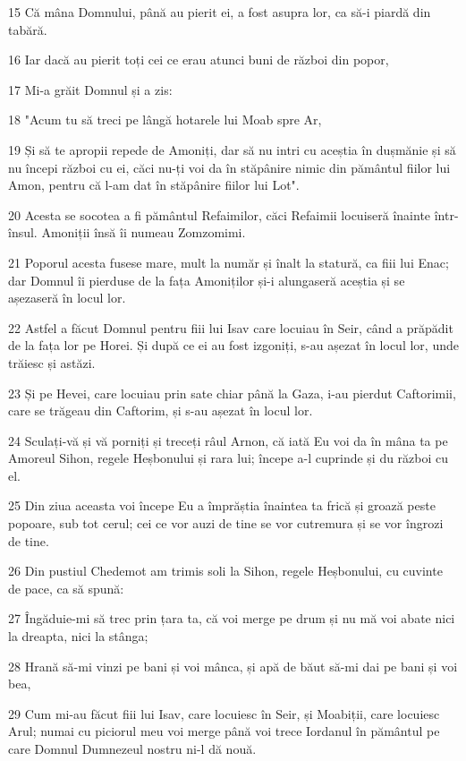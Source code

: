 \par 15 Că mâna Domnului, până au pierit ei, a fost asupra lor, ca să-i piardă din tabără.
\par 16 Iar dacă au pierit toți cei ce erau atunci buni de război din popor,
\par 17 Mi-a grăit Domnul și a zis:
\par 18 "Acum tu să treci pe lângă hotarele lui Moab spre Ar,
\par 19 Și să te apropii repede de Amoniți, dar să nu intri cu aceștia în dușmănie și să nu începi război cu ei, căci nu-ți voi da în stăpânire nimic din pământul fiilor lui Amon, pentru că l-am dat în stăpânire fiilor lui Lot".
\par 20 Acesta se socotea a fi pământul Refaimilor, căci Refaimii locuiseră înainte într-însul. Amoniții însă îi numeau Zomzomimi.
\par 21 Poporul acesta fusese mare, mult la număr și înalt la statură, ca fiii lui Enac; dar Domnul îi pierduse de la fața Amoniților și-i alungaseră aceștia și se așezaseră în locul lor.
\par 22 Astfel a făcut Domnul pentru fiii lui Isav care locuiau în Seir, când a prăpădit de la fața lor pe Horei. Și după ce ei au fost izgoniți, s-au așezat în locul lor, unde trăiesc și astăzi.
\par 23 Și pe Hevei, care locuiau prin sate chiar până la Gaza, i-au pierdut Caftorimii, care se trăgeau din Caftorim, și s-au așezat în locul lor.
\par 24 Sculați-vă și vă porniți și treceți râul Arnon, că iată Eu voi da în mâna ta pe Amoreul Sihon, regele Heșbonului și rara lui; începe a-l cuprinde și du război cu el.
\par 25 Din ziua aceasta voi începe Eu a împrăștia înaintea ta frică și groază peste popoare, sub tot cerul; cei ce vor auzi de tine se vor cutremura și se vor îngrozi de tine.
\par 26 Din pustiul Chedemot am trimis soli la Sihon, regele Heșbonului, cu cuvinte de pace, ca să spună:
\par 27 Îngăduie-mi să trec prin țara ta, că voi merge pe drum și nu mă voi abate nici la dreapta, nici la stânga;
\par 28 Hrană să-mi vinzi pe bani și voi mânca, și apă de băut să-mi dai pe bani și voi bea,
\par 29 Cum mi-au făcut fiii lui Isav, care locuiesc în Seir, și Moabiții, care locuiesc Arul; numai cu piciorul meu voi merge până voi trece Iordanul în pământul pe care Domnul Dumnezeul nostru ni-l dă nouă.
